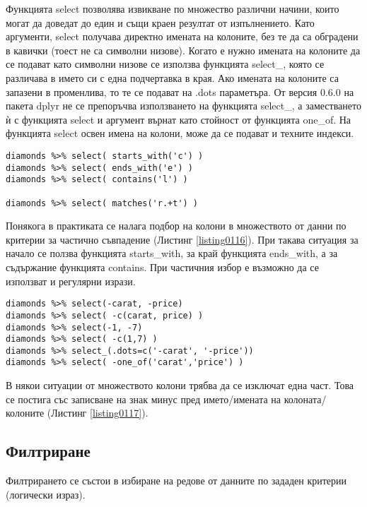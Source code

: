 Функцията select позволява извикване по множество различни начини, които могат да доведат до един и същи краен резултат от изпълнението. Като аргументи, select получава директно имената на колоните, без те да са обградени в кавички (тоест не са символни низове). Когато е нужно имената на колоните да се подават като символни низове се използва функцията select\_, която се различава в името си с една подчертавка в края. Ако имената на колоните са запазени в променлива, то те се подават на .dots параметъра. От версия 0.6.0 на пакета dplyr не се препоръчва използването на функцията select\_, а заместването ѝ с функцията select и аргумент върнат като стойност от функцията one\_of. На функцията select освен имена на колони, може да се подават и техните индекси.

\begin{lstlisting}[caption=Търсене по частично съвпадение, label=listing0116]
diamonds %>% select( starts_with('c') )
diamonds %>% select( ends_with('e') )
diamonds %>% select( contains('l') )

diamonds %>% select( matches('r.+t') )
\end{lstlisting}

Понякога в практиката се налага подбор на колони в множеството от данни по критерии за частично съвпадение (Листинг \ref{listing0116}). При такава ситуация за начало се ползва функцията starts\_with, за край функцията ends\_with, а за съдържание функцията contains. При частичния избор е възможно да се използват и регулярни изрази.

\begin{lstlisting}[caption=Изключване на колони, label=listing0117]
diamonds %>% select(-carat, -price)
diamonds %>% select( -c(carat, price) )
diamonds %>% select(-1, -7)
diamonds %>% select( -c(1,7) )
diamonds %>% select_(.dots=c('-carat', '-price'))
diamonds %>% select( -one_of('carat','price') )
\end{lstlisting}

В някои ситуации от множеството колони трябва да се изключат една част. Това се постига със записване на знак минус пред името/имената на колоната/колоните (Листинг \ref{listing0117}).

\subsection{Филтриране}

Филтрирането се състои в избиране на редове от данните по зададен критерии (логически израз).

